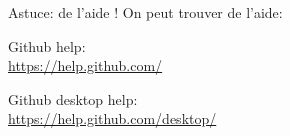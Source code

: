 \documentclass{beamer}
\begin{document}
\begin{frame}{Astuce: de l'aide !}
    On peut trouver de l'aide:
    
    \begin{center}
    	Github help:\\ \url{https://help.github.com/}
    \end{center}
    \begin{center}
        Github desktop help:\\ \url{https://help.github.com/desktop/}
    \end{center}
\end{frame}


% 
% 
% 
% 


%    
\end{document}

